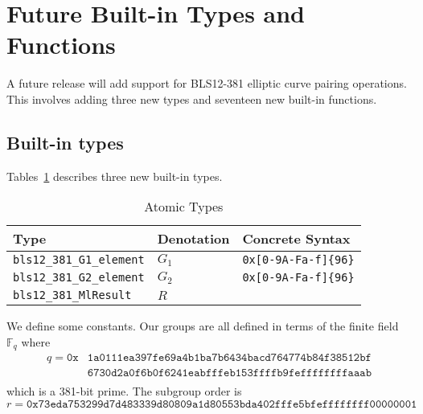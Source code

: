\renewcommand{\note}[1]{
  \bigskip
  \refstepcounter{notenumberC}
  \noindent\textbf{Note \thenotenumberC. #1}
}

\newpage

\section{Future Built-in Types and Functions}
\label{appendix:default-builtins-future}
A future release will add support for BLS12-381 elliptic curve pairing
operations.  This involves adding three new types and seventeen new built-in
functions.

\subsection{Built-in types}
\label{sec:future-built-in-types}
Tables~\ref{table:future-built-in-types} describes three new built-in
types.

\newcommand{\Gone}{G_1}
\newcommand{\Gtwo}{G_2}
\newcommand{\MlResult}{R}

\newcommand{\Fq}{\mathbb{F}_q}
\newcommand{\Fqq}{\mathbb{F}_{q^2}}


\begin{table}[H]
  \centering
    \begin{tabular}{|l|p{6cm}|l|}
        \hline
        Type & Denotation & Concrete Syntax\\
        \hline
        \texttt{bls12\_381\_G1\_element} &   $\Gone$ & \texttt{0x[0-9A-Fa-f]\{96\}}\\
        \texttt{bls12\_381\_G2\_element} &   $\Gtwo$ & \texttt{0x[0-9A-Fa-f]\{96\}}\\
        \texttt{bls12\_381\_MlResult}    &   $\MlResult$  &  \\
        \hline
    \end{tabular}
    \caption{Atomic Types}
    \label{table:future-built-in-types}
\end{table}

We define some constants.  Our groups are all defined in terms of the  finite field $\Fq$ where
\begin{align*}
q = \mathtt{0x}&\mathtt{1a0111ea397fe69a4b1ba7b6434bacd764774b84f38512bf}\\
              &\mathtt{6730d2a0f6b0f6241eabfffeb153ffffb9feffffffffaaab}\\
\end{align*}
which is a 381-bit prime.  The subgroup order is
$$
r = \mathtt{0x73eda753299d7d483339d80809a1d80553bda402fffe5bfeffffffff00000001}
$$


